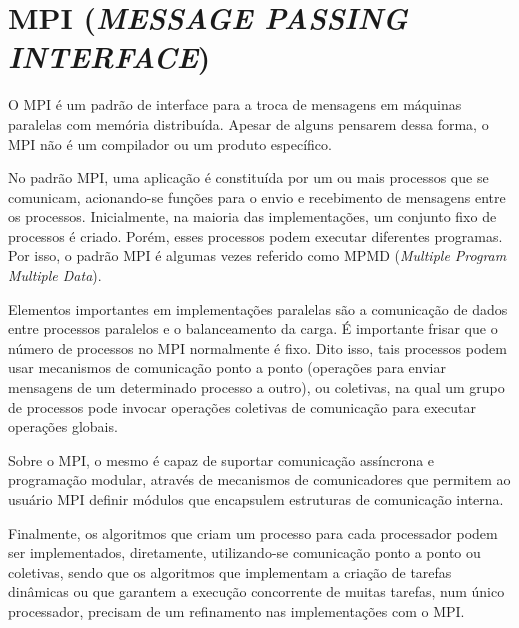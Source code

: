\section{\normalsize MPI (\textit{MESSAGE PASSING INTERFACE})}
	O  MPI é um padrão de interface para a troca de mensagens em máquinas paralelas com memória distribuída. Apesar de alguns pensarem dessa forma, o MPI não é um compilador ou um produto específico.
	
	No padrão MPI, uma aplicação é constituída por um ou mais processos que se comunicam, acionando-se funções para o envio e recebimento de mensagens entre os processos. Inicialmente, na maioria das implementações, um conjunto fixo de processos é criado. Porém, esses processos podem executar diferentes programas. Por isso, o padrão MPI é algumas vezes referido como MPMD (\textit{Multiple Program Multiple Data}).

Elementos importantes em implementações paralelas são a comunicação de dados entre processos paralelos e o balanceamento da carga. É importante frisar que o número de processos no MPI normalmente é fixo. Dito isso, tais processos podem usar mecanismos de comunicação ponto a ponto (operações para enviar mensagens de um determinado processo a outro), ou coletivas, na qual um grupo de processos pode invocar operações coletivas de comunicação para executar operações globais. 

Sobre o MPI, o mesmo é capaz de suportar comunicação assíncrona e programação modular, através de mecanismos de comunicadores que permitem ao usuário MPI definir módulos que encapsulem estruturas de comunicação interna.

Finalmente, os algoritmos que criam um processo para cada processador podem ser implementados, diretamente, utilizando-se comunicação ponto a ponto ou coletivas, sendo que os algoritmos que implementam a criação de tarefas dinâmicas ou que garantem a execução concorrente de muitas tarefas, num único processador, precisam de um refinamento nas implementações com o MPI.